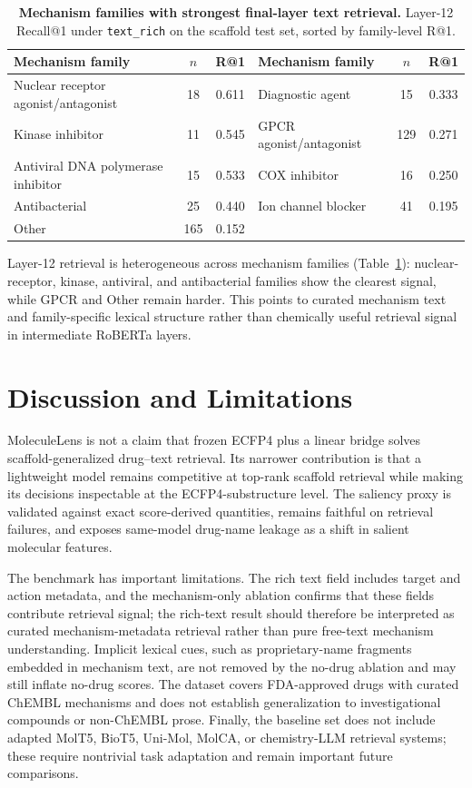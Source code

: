\documentclass{article}
\begin{document}
\begin{table}[!htbp]
\centering
\footnotesize
\setlength{\tabcolsep}{4pt}
\renewcommand{\arraystretch}{0.95}
\caption{\textbf{Mechanism families with strongest final-layer text retrieval.} Layer-12 Recall@1 under \texttt{text\_rich} on the scaffold test set, sorted by family-level R@1.}
\label{tab:logit-lens-family-main}
\begin{tabular}{l c c l c c}
\toprule
Mechanism family & $n$ & R@1 & Mechanism family & $n$ & R@1 \\
\midrule
Nuclear receptor agonist/antagonist & 18 & 0.611 & Diagnostic agent & 15 & 0.333 \\
Kinase inhibitor & 11 & 0.545 & GPCR agonist/antagonist & 129 & 0.271 \\
Antiviral DNA polymerase inhibitor & 15 & 0.533 & COX inhibitor & 16 & 0.250 \\
Antibacterial & 25 & 0.440 & Ion channel blocker & 41 & 0.195 \\
Other & 165 & 0.152 & & & \\
\bottomrule
\end{tabular}
\end{table}

Layer-12 retrieval is heterogeneous across mechanism families (Table~\ref{tab:logit-lens-family-main}): nuclear-receptor, kinase, antiviral, and antibacterial families show the clearest signal, while GPCR and Other remain harder. This points to curated mechanism text and family-specific lexical structure rather than chemically useful retrieval signal in intermediate RoBERTa layers.

\section{Discussion and Limitations}
\label{sec:discussion}

MoleculeLens is not a claim that frozen ECFP4 plus a linear bridge solves scaffold-generalized drug--text retrieval. Its narrower contribution is that a lightweight model remains competitive at top-rank scaffold retrieval while making its decisions inspectable at the ECFP4-substructure level. The saliency proxy is validated against exact score-derived quantities, remains faithful on retrieval failures, and exposes same-model drug-name leakage as a shift in salient molecular features.

The benchmark has important limitations. The rich text field includes target and action metadata, and the mechanism-only ablation confirms that these fields contribute retrieval signal; the rich-text result should therefore be interpreted as curated mechanism-metadata retrieval rather than pure free-text mechanism understanding. Implicit lexical cues, such as proprietary-name fragments embedded in mechanism text, are not removed by the no-drug ablation and may still inflate no-drug scores. The dataset covers FDA-approved drugs with curated ChEMBL mechanisms and does not establish generalization to investigational compounds or non-ChEMBL prose. Finally, the baseline set does not include adapted MolT5, BioT5, Uni-Mol, MolCA, or chemistry-LLM retrieval systems; these require nontrivial task adaptation and remain important future comparisons.
\end{document}
